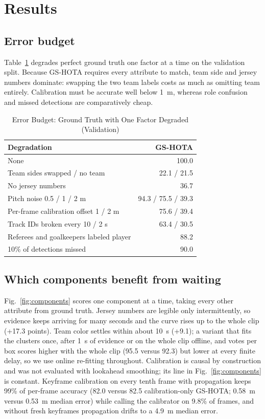 \documentclass[conference]{IEEEtran}
\begin{document}
\section{Results}

\subsection{Error budget}
Table~\ref{tab:budget} degrades perfect ground truth one factor at a time on the validation split. Because GS-HOTA requires every attribute to match, team side and jersey numbers dominate: swapping the two team labels costs as much as omitting team entirely. Calibration must be accurate well below 1~m, whereas role confusion and missed detections are comparatively cheap.

\begin{table}[t]
\caption{Error Budget: Ground Truth with One Factor Degraded (Validation)}
\label{tab:budget}
\centering
\footnotesize
\begin{tabular}{@{}lr@{}}
\toprule
Degradation & GS-HOTA \\
\midrule
None & 100.0 \\
Team sides swapped / no team & 22.1 / 21.5 \\
No jersey numbers & 36.7 \\
Pitch noise 0.5 / 1 / 2 m & 94.3 / 75.5 / 39.3 \\
Per-frame calibration offset 1 / 2 m & 75.6 / 39.4 \\
Track IDs broken every 10 / 2 s & 63.4 / 30.5 \\
Referees and goalkeepers labeled player & 88.2 \\
10\% of detections missed & 90.0 \\
\bottomrule
\end{tabular}
\end{table}

\subsection{Which components benefit from waiting}
Fig.~\ref{fig:components} scores one component at a time, taking every other attribute from ground truth. Jersey numbers are legible only intermittently, so evidence keeps arriving for many seconds and the curve rises up to the whole clip (+17.3 points). Team color settles within about 10~s (+9.1); a variant that fits the clusters once, after 1~s of evidence or on the whole clip offline, and votes per box scores higher with the whole clip (95.5 versus 92.3) but lower at every finite delay, so we use online re-fitting throughout. Calibration is causal by construction and was not evaluated with lookahead smoothing; its line in Fig.~\ref{fig:components} is constant. Keyframe calibration on every tenth frame with propagation keeps 99\% of per-frame accuracy (82.0 versus 82.5 calibration-only GS-HOTA; 0.58~m versus 0.53~m median error) while calling the calibrator on 9.8\% of frames, and without fresh keyframes propagation drifts to a 4.9~m median error.
\end{document}
